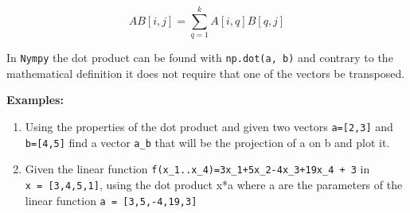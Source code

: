 \documentclass[11pt]{article}
\begin{document}
\[
AB[i,j] = \sum_{q=1}^{k} A[i,q] B[q,j]
\]

In \texttt{Nympy} the dot product can be found with
\texttt{np.dot(a,\ b)} and contrary to the mathematical definition it
does not require that one of the vectors be transposed.

\textbf{Examples:}

\begin{enumerate}
\def\labelenumi{\arabic{enumi}.}
\item
  Using the properties of the dot product and given two vectors
  \texttt{a={[}2,3{]}} and \texttt{b={[}4,5{]}} find a vector
  \texttt{a\_b} that will be the projection of a on b and plot it.
\item
  Given the linear function
  \texttt{f(x\_1..x\_4)=3x\_1+5x\_2-4x\_3+19x\_4\ +\ 3} in
  \texttt{x\ =\ {[}3,4,5,1{]}}, using the dot product x*a where a are
  the parameters of the linear function \texttt{a\ =\ {[}3,5,-4,19,3{]}}
\end{enumerate}
\end{document}
